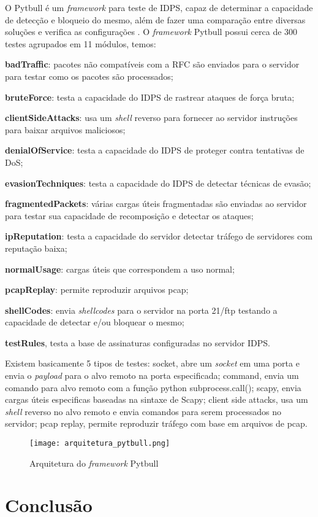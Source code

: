  O Pytbull é um \textit{framework} para teste de IDPS, capaz de determinar a capacidade de detecção e bloqueio do mesmo, além de fazer uma comparação entre diversas soluções e verifica as configurações \cite{pytbull}. O \textit{framework} Pytbull possui cerca de 300 testes agrupados em 11 módulos, temos:

 \begin{alineas}
  \item \textbf{badTraffic}: pacotes não compatíveis com a RFC são enviados para o servidor para testar como os pacotes são processados; 
  \item \textbf{bruteForce}: testa a capacidade do IDPS de rastrear ataques de força bruta;
  \item \textbf{clientSideAttacks}: usa um \textit{shell} reverso para fornecer ao servidor instruções para baixar arquivos maliciosos; 
  \item \textbf{denialOfService}: testa a capacidade do IDPS de proteger contra tentativas de DoS; 
  \item \textbf{evasionTechniques}: testa a capacidade do IDPS de detectar técnicas de evasão; 
  \item \textbf{fragmentedPackets}: várias cargas úteis fragmentadas são enviadas ao servidor para testar sua capacidade de recomposição e detectar os ataques; 
  \item \textbf{ipReputation}: testa a capacidade do servidor detectar tráfego de servidores com reputação baixa;
  \item \textbf{normalUsage}: cargas úteis que correspondem a uso normal; 
  \item \textbf{pcapReplay}: permite reproduzir arquivos pcap; 
  \item \textbf{shellCodes}: envia \textit{shellcodes} para o servidor na porta 21/ftp testando a capacidade de detectar e/ou bloquear o mesmo; 
  \item \textbf{testRules}, testa a base de assinaturas configuradas no servidor IDPS.
 \end{alineas}

 Existem basicamente 5 tipos de testes: socket, abre um \textit{socket} em uma porta e envia o \textit{payload} para o alvo remoto na porta especificada; command, envia um comando para alvo remoto com a função python subprocess.call(); scapy, envia cargas úteis especificas baseadas na sintaxe de Scapy; client side attacks, usa um \textit{shell} reverso no alvo remoto e envia comandos para serem processados no servidor; pcap replay, permite reproduzir tráfego com base em arquivos de pcap.

 \begin{figure}[htb]
  \centering
  \caption{Arquitetura do \textit{framework} Pytbull}
  \texttt{[image: arquitetura\_pytbull.png]}
  \legend{}
  \label{fig:pytbull}
 \end{figure}

 \section{Conclusão}
